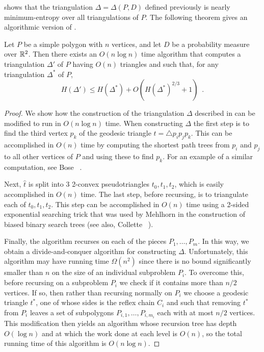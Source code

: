 \documentclass[lotsofwhite]{patmorin}
\newcommand{\z}[1]{{\hat{#1}}}
\begin{document}
 shows that the triangulation
$\Delta=\Delta(P,D)$ defined previously is nearly minimum-entropy over
all triangulations of $P$.  The following theorem gives an algorithmic
version of .

\begin{thm}
Let $P$ be a simple polygon with $n$ vertices, and let $D$ be a
probability measure over $\mathbb{R}^2$.  Then there exists an $O(n\log n)$
time algorithm that computes a triangulation $\Delta'$ of $P$ having
$O(n)$ triangles and such that, for any triangulation $\Delta^*$ of
$P$,
\[
    H(\Delta') \le H(\Delta^*) + O(H(\Delta^*)^{2/3}+1) \enspace .
\]
\end{thm}

\begin{proof}
We show how the construction of the triangulation $\Delta$ described in
 can be modified to run in $O(n\log n)$ time.  When
constructing $\Delta$ the first step is to find the third vertex $p_k$ of the
geodesic triangle $t=\triangle p_i p_j p_k$.  This can be accomplished
in $O(n)$ time by computing the shortest path trees from $p_i$ and
$p_j$ to all other vertices of $P$ and using these to find $p_k$.  For
an example of a similar computation, see Bose \etal\
\cite[Section~2.2]{bdhlim07}.

Next, $\z t$ is split into 3 2-convex pseudotriangles $t_0,t_1,t_2$,
which is easily accomplished in $O(n)$ time.  The last step, before
recursing, is to triangulate each of $t_0,t_1,t_2$.  This step can be
accomplished in $O(n)$ time using a 2-sided exponential searching
trick that was used by Mehlhorn \cite{m75} in the construction of
biased binary search trees (see also, Collette \etal\
\cite[Theorem~1]{cdilm08}).

Finally, the algorithm recurses on each of the pieces
$P_1,\ldots,P_m$.  In this way, we obtain a divide-and-conquer
algorithm for constructing $\Delta$.  Unfortunately, this algorithm
may have running time $\Omega(n^2)$ since there is no bound
significantly smaller than $n$ on the size of an individual subproblem
$P_i$.  To overcome this, before recursing on a subproblem $P_i$ we
check if it contains more than $n/2$ vertices.  If so, then rather
than recursing normally on $P_i$ we choose a geodesic triangle $t^*$,
one of whose sides is the reflex chain $C_i$ and such that removing
$t^*$ from $P_i$ leaves a set of subpolygons
$P_{i,1},\ldots,P_{i,m_i}$ each with at most $n/2$ vertices.  This
modification then yields an algorithm whose recursion tree has depth
$O(\log n)$ and at which the work done at each level is $O(n)$, so the
total running time of this algorithm is $O(n\log n)$.


\end{proof}
\end{document}
